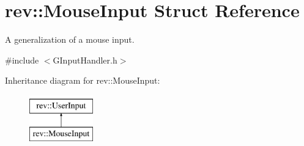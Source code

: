 \hypertarget{structrev_1_1_mouse_input}{}\section{rev\+::Mouse\+Input Struct Reference}
\label{structrev_1_1_mouse_input}


A generalization of a mouse input.  




{\ttfamily \#include $<$G\+Input\+Handler.\+h$>$}

Inheritance diagram for rev\+::Mouse\+Input\+:\begin{figure}[H]
\begin{center}
\leavevmode
\includegraphics[height=2.000000cm]{structrev_1_1_mouse_input}
\end{center}
\end{figure}
